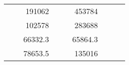 \begin{table}[H]
\begin{tabular}{|ccrccrccc}
\multicolumn{1}{|c|}{\cellcolor[HTML]{FFFFC7}}                                & \multicolumn{1}{c|}{\cellcolor[HTML]{DDFDFF}}                      & \multicolumn{1}{r|}{\cellcolor[HTML]{DAE8FC}191062}    & \multicolumn{1}{c|}{\cellcolor[HTML]{FFFFC7}}                                & \multicolumn{1}{c|}{\cellcolor[HTML]{DDFDFF}}                       & \multicolumn{1}{r|}{\cellcolor[HTML]{DDFDFF}453784}    &                                                                              &                                                                    &                                                        \\ \cline{3-3} \cline{6-6}
\multicolumn{1}{|c|}{\cellcolor[HTML]{FFFFC7}}                                & \multicolumn{1}{c|}{\cellcolor[HTML]{DDFDFF}}                      & \multicolumn{1}{r|}{\cellcolor[HTML]{DDFDFF}102578}    & \multicolumn{1}{c|}{\cellcolor[HTML]{FFFFC7}}                                & \multicolumn{1}{c|}{\cellcolor[HTML]{DDFDFF}}                       & \multicolumn{1}{r|}{\cellcolor[HTML]{DAE8FC}283688}    &                                                                              &                                                                    &                                                        \\ \cline{3-3} \cline{6-6}
\multicolumn{1}{|c|}{\cellcolor[HTML]{FFFFC7}}                                & \multicolumn{1}{c|}{\cellcolor[HTML]{DDFDFF}}                      & \multicolumn{1}{r|}{\cellcolor[HTML]{DAE8FC}66332.3}   & \multicolumn{1}{c|}{\cellcolor[HTML]{FFFFC7}}                                & \multicolumn{1}{c|}{\cellcolor[HTML]{DDFDFF}}                       & \multicolumn{1}{r|}{\cellcolor[HTML]{DDFDFF}65864.3}   &                                                                              &                                                                    &                                                        \\ \cline{3-3} \cline{6-6}
\multicolumn{1}{|c|}{\cellcolor[HTML]{FFFFC7}}                                & \multicolumn{1}{c|}{\cellcolor[HTML]{DDFDFF}}                      & \multicolumn{1}{r|}{\cellcolor[HTML]{DDFDFF}78653.5}   & \multicolumn{1}{c|}{\cellcolor[HTML]{FFFFC7}}                                & \multicolumn{1}{c|}{\cellcolor[HTML]{DDFDFF}}                       & \multicolumn{1}{r|}{\cellcolor[HTML]{DAE8FC}135016}    &                                                                              &                                                                    &                                                        \\ \cline{3-3} \cline{6-6}

\end{tabular}
\end{table}
